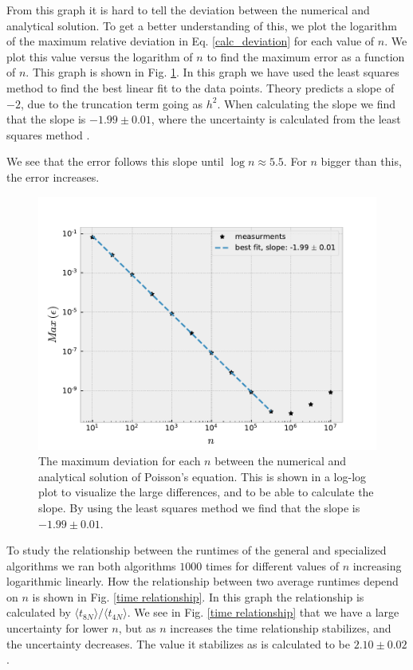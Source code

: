\documentclass[%
 reprint,
nofootinbib,
 amsmath,amssymb,
 aps,
]{revtex4-1}
\begin{document}
From this graph it is hard to tell the deviation between the numerical and analytical solution. To get a better understanding of this, we plot the logarithm of the maximum relative deviation in Eq. \eqref{calc_deviation} for each value of $n$. We plot this value versus the logarithm of $n$ to find the maximum error as a function of $n$. This graph is shown in Fig. \ref{error}. In this graph we have used the least squares method to find the best linear fit to the data points. Theory predicts a slope of $-2$, due to the truncation term going as $h^2$. When calculating the slope we find that the slope is $-1.99\pm0.01$, where the uncertainty is calculated from the least squares method \cite{squires}.

We see that the error follows this slope until $\log n  \approx 5.5$. For $n$ bigger than this, the error increases.

\begin{figure}
\centering
\includegraphics[scale=0.5]{../figures/log_difference.pdf}
\caption{The maximum deviation for each $n$ between the numerical and analytical solution of Poisson's equation. This is shown in a log-log plot to visualize the large differences, and to be able to calculate the slope. By using the least squares method we find that the slope is $-1.99\pm0.01$.}
\label{error}
\end{figure}

\par

To study the relationship between the runtimes of the general and specialized algorithms we ran both algorithms $1000$ times for different values of $n$ increasing logarithmic linearly. How the relationship between two average runtimes depend on $n$ is shown in Fig. \vref{time relationship}. In this graph the relationship is calculated by $\langle t_{8N} \rangle /\langle t_{4N} \rangle$. We see in Fig. \vref{time relationship} that we have a large uncertainty for lower $n$, but as $n$ increases the time relationship stabilizes, and the uncertainty decreases. The value it stabilizes as is calculated to be $2.10\pm0.02$.
\end{document}
